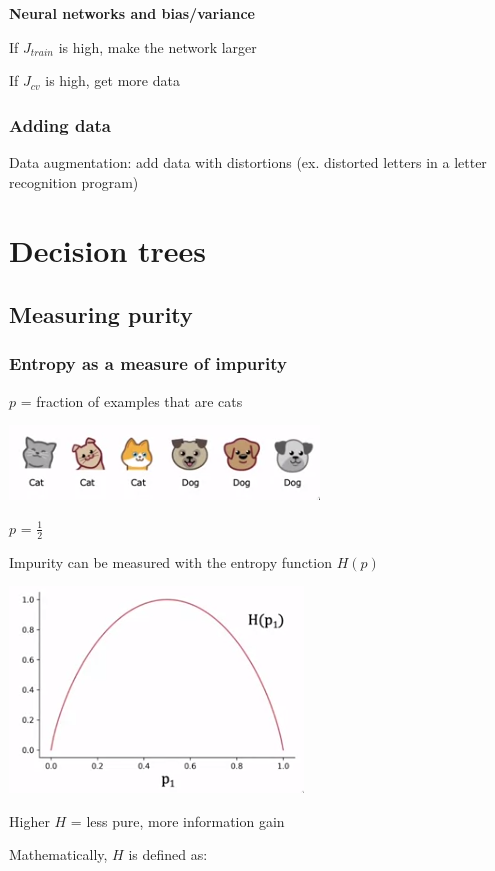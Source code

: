 \documentclass[12pt]{article}
\begin{document}
\textbf{Neural networks and bias/variance}

If $J_{train}$ is high, make the network larger

If $J_{cv}$ is high, get more data

\subsubsection{Adding data}

Data augmentation: add data with distortions (ex. distorted letters in a letter recognition program)

\section{Decision trees}

\subsection{Measuring purity}

\subsubsection{Entropy as a measure of impurity}

$p$ = fraction of examples that are cats

\includegraphics{purity}

$p$ = $\frac{1}{2}$

Impurity can be measured with the entropy function $H(p)$

\includegraphics{entropy}

Higher $H$ = less pure, more information gain

Mathematically, $H$ is defined as:
\end{document}
